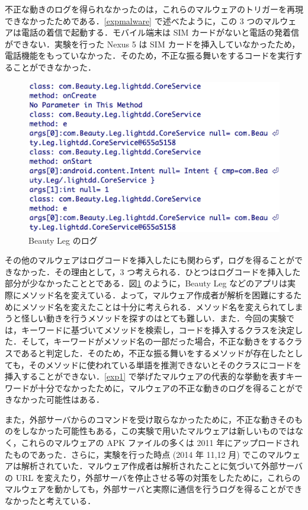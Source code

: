 不正な動きのログを得られなかったのは，これらのマルウェアのトリガーを再現できなかったためである．\ref{expmalware} で述べたように，この 3 つのマルウェアは電話の着信で起動する．モバイル端末は SIM カードがないと電話の発着信ができない．実験を行った Nexus 5 は SIM カードを挿入していなかったため，電話機能をもっていなかった．そのため，不正な振る舞いをするコードを実行することができなかった．

\begin{figure}[t]
\begin{center}
\graphicspath{{./epsfiles/}}
\includegraphics[scale=0.25]{beautyleg2.eps}
\end{center}
\caption{Beauty Leg のログ}
\label{leg}
\end{figure}

その他のマルウェアはログコードを挿入したにも関わらず，ログを得ることができなかった．その理由として，3 つ考えられる．ひとつはログコードを挿入した部分が少なかったこととである．図\ref{leg} のように，Beauty Leg などのアプリは実際にメソッド名を変えている．よって，マルウェア作成者が解析を困難にするためにメソッド名を変えたことは十分に考えられる．メソッド名を変えられてしまうと怪しい動きを行うメソッドを探すのはとても難しい．また．今回の実験では，キーワードに基づいてメソッドを検索し，コードを挿入するクラスを決定した．そして，キーワードがメソッド名の一部だった場合，不正な動きをするクラスであると判定した．そのため，不正な振る舞いをするメソッドが存在したとしても，そのメソッドに使われている単語を推測できないとそのクラスにコードを挿入することができない．\ref{exp1} で挙げたマルウェアの代表的な挙動を表すキーワードが十分でなかったために，マルウェアの不正な動きのログを得ることができなかった可能性はある．

また，外部サーバからのコマンドを受け取らなかったために，不正な動きそのものをしなかった可能性もある，この実験で用いたマルウェアは新しいものではなく，これらのマルウェアの APK ファイルの多くは 2011 年にアップロードされたものであった\cite{malwaresite}．さらに，実験を行った時点 (2014 年 11,12 月) でこのマルウェアは解析されていた．マルウェア作成者は解析されたことに気づいて外部サーバの URL を変えたり，外部サーバを停止させる等の対策をしたために，これらのマルウェアを動かしても，外部サーバと実際に通信を行うログを得ることができなかったと考えている．

